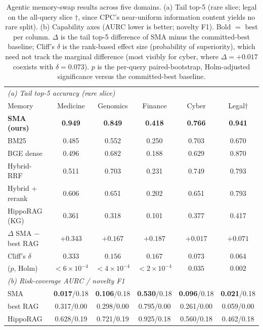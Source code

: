 \documentclass[pdflatex,sn-nature]{sn-jnl}
\begin{document}
\begin{table}[t]\centering\footnotesize
\caption{Agentic memory-swap results across five domains. (a) Tail top-5 (rare
slice; legal on the all-query slice $\dagger$, since CPC's near-uniform information
content yields no rare split). (b) Capability axes (AURC lower is better; novelty
F1). Bold $=$ best per column. $\Delta$ is the tail top-5 difference of SMA minus
the committed-best baseline; Cliff's $\delta$ is the rank-based effect size
(probability of superiority), which need not track the marginal difference (most
visibly for cyber, where $\Delta{=}{+}0.017$ coexists with $\delta{=}0.073$). $p$ is
the per-query paired-bootstrap, Holm-adjusted significance versus the committed-best
baseline.}
\begin{tabular}{lccccc}
\toprule
\multicolumn{6}{l}{\textit{(a) Tail top-5 accuracy (rare slice)}}\\
Memory & Medicine & Genomics & Finance & Cyber & Legal$\dagger$ \\
\midrule
\rowcolor{smarow}\textbf{SMA (ours)} & \textbf{0.949} & \textbf{0.849} & \textbf{0.418} & \textbf{0.766} & \textbf{0.941} \\
BM25 & 0.485 & 0.552 & 0.250 & 0.703 & 0.670 \\
BGE dense & 0.496 & 0.682 & 0.188 & 0.629 & 0.870 \\
Hybrid-RRF & 0.511 & 0.703 & 0.231 & 0.749 & 0.793 \\
Hybrid + rerank & 0.606 & 0.651 & 0.202 & 0.651 & 0.793 \\
HippoRAG (KG) & 0.361 & 0.318 & 0.101 & 0.377 & 0.417 \\
$\Delta$ SMA $-$ best RAG & $+0.343$ & $+0.167$ & $+0.187$ & $+0.017$ & $+0.071$ \\
Cliff's $\delta$ & $0.333$ & $0.156$ & $0.167$ & $0.073$ & $0.064$ \\
($p$, Holm) & $<6{\times}10^{-4}$ & $<4{\times}10^{-4}$ & $<2{\times}10^{-4}$ & $0.035$ & $0.002$ \\
\midrule
\multicolumn{6}{l}{\textit{(b) Risk-coverage AURC / novelty F1}}\\
\rowcolor{smarow}SMA & \textbf{0.017}/0.18 & \textbf{0.106}/0.18 & \textbf{0.530}/0.18 & \textbf{0.096}/0.18 & \textbf{0.021}/0.18 \\
best RAG & 0.317/0.00 & 0.298/0.00 & 0.795/0.00 & 0.261/0.00 & 0.059/0.00 \\
HippoRAG & 0.628/0.19 & 0.721/0.19 & 0.925/0.18 & 0.560/0.18 & 0.462/0.18 \\
\bottomrule
\end{tabular}
\end{table}
\end{document}
